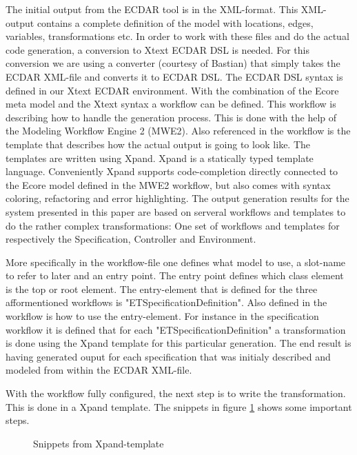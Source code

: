 The initial output from the ECDAR tool is in the XML-format. This XML-output
contains a complete definition of the model with locations, edges, variables,
transformations etc. In order to work with these files and do the actual code
generation, a conversion to Xtext ECDAR DSL is needed. For this conversion we
are using a converter (courtesy of Bastian) that simply takes the ECDAR XML-file
and converts it to ECDAR DSL. The ECDAR DSL syntax is defined in our Xtext ECDAR
environment. With the combination of the Ecore meta model and the Xtext syntax a
workflow can be defined. This workflow is describing how to handle the
generation process. This is done with the help of the Modeling Workflow Engine 2
(MWE2). Also referenced in the workflow is the template that describes how the
actual output is going to look like. The templates are written using
Xpand. Xpand is a statically typed template language. Conveniently Xpand
supports code-completion directly connected to the Ecore model defined in the
MWE2 workflow, but also comes with syntax coloring, refactoring and error
highlighting. The output generation results for the system presented in this
paper are based on serveral workflows and templates to do the rather complex
transformations: One set of workflows and templates for respectively the
Specification, Controller and Environment.

More specifically in the workflow-file one defines what model to use, a
slot-name to refer to later and an entry point. The entry point defines which
class element is the top or root element. The entry-element that is defined for
the three afformentioned workflows is "ETSpecificationDefinition". Also defined
in the workflow is how to use the entry-element. For instance in the
specification workflow it is defined that for each "ETSpecificationDefinition" a
transformation is done using the Xpand template for this particular
generation. The end result is having generated ouput for each specification that
was initialy described and modeled from within the ECDAR XML-file.

With the workflow fully configured, the next step is to write the
transformation. This is done in a Xpand template. The snippets in figure
\ref{xpand-example} shows some important steps.

\begin{figure}[t]



\caption{Snippets from Xpand-template \label{xpand-example}}
\end{figure}

